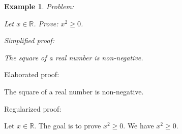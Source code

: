 \documentclass{article}
\newtheorem{example}{Example}
\begin{document}
\begin{example}
Problem:
\begin{tcolorbox}[colback=yellow!10, width=\linewidth]
Let $x\in\mathbb{R}$. Prove: $x^2\ge 0$.
\end{tcolorbox}

Simplified proof:
\begin{tcolorbox}[colback=blue!10, width=\linewidth]
The square of a real number is non-negative.
\end{tcolorbox}
\end{example}

Elaborated proof:
\begin{tcolorbox}[colback=green!10, width=\linewidth]
The square of a real number is non-negative.
\end{tcolorbox}

Regularized proof:
\begin{tcolorbox}[colback=red!10, width=\linewidth]
Let $x\in\mathbb{R}$.
The goal is to prove ${{x}}^2 \ge 0$.
We have ${{x}}^2 \ge 0$.
\end{tcolorbox}
\end{document}
